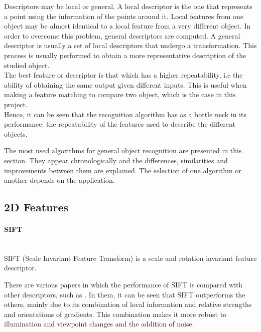Descriptors may be local or general. 
A local descriptor is the one that represents a point using the information of the points around it. 
Local features from one object may be almost identical to a local feature from a very different object. 
In order to overcome this problem, general descriptors are computed. 
A general descriptor is usually a set of local descriptors that undergo a transformation. 
This process is usually performed to obtain a more representative description of the studied object. 
\\

The best feature or descriptor is that which has a higher repeatability, i.e the ability of obtaining the same output given different inputs. 
This is useful when making a feature matching to compare two object, which is the case in this project. 
\\

Hence, it can be seen that the recognition algorithm has as a bottle neck in its performance: the repeatability of the features used to describe the different objects. 

The most used algorithms for general object recognition are presented in this section. 
They appear chronologically and the differences, similarities and improvements between them are explained. 
The selection of one algorithm or another depends on the application.
\\

\subsection{2D Features}
\label{2d_features}

\paragraph{SIFT}\mbox{}\\

SIFT (Scale Invariant Feature Transform) is a scale and rotation invariant feature descriptor\cite{sift}. 

There are various papers in which the performance of SIFT is compared with other descriptors, such as \cite{Mikolajczyk2005}. In them, it can be seen that SIFT outperforms the others, mainly due to its combination of local information and relative strengths and orientations of gradients. This combination makes it more robust to illumination and viewpoint changes and the addition of noise. 
\\

